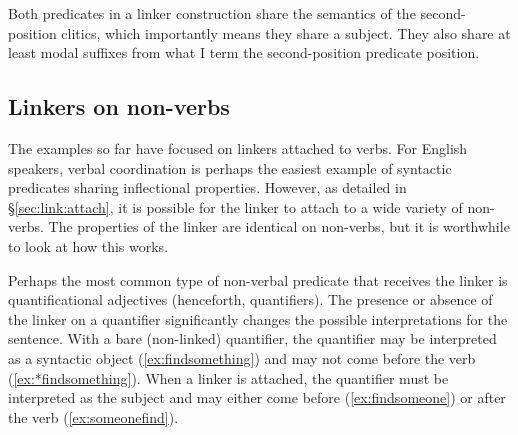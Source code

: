 Both predicates in a linker construction share the semantics of the second-position clitics, which importantly means they share a subject. They also share at least modal suffixes from what I term the second-position predicate position.


\begin{comment}
\ex \label{ex:someonespoke}
\begingl
\glpreamble ʔuušqḥʔaƛ ciqšiƛ.//
\gla ʔuuš-qḥ=ʔaƛ ciq-šiƛ //
\glb some-\textsc{link}=\textsc{now} speak-\textsc{mo} //
\glft `Someone spoke.' //
\endgl
\xe

\ex~ \label{ex:*someonespoke}
\begingl
\glpreamble *ʔuušqḥʔaƛ ciqšiƛḥ.//
\gla *ʔuuš-(q)ḥ=ʔaƛ ciq-šiƛ-(q)ḥ //
\glb *some-\textsc{link}=\textsc{now} speak-\textsc{mo}-\textsc{link} //
\glft Intended: `Someone spoke.' //
\endgl
\xe
\end{comment}


\subsection{Linkers on non-verbs} \label{sec:link:nonverb}

The examples so far have focused on linkers attached to verbs. For English speakers, verbal coordination is perhaps the easiest example of syntactic predicates sharing inflectional properties. However, as detailed in \S\ref{sec:link:attach}, it is possible for the linker to attach to a wide variety of non-verbs. The properties of the linker are identical on non-verbs, but it is worthwhile to look at how this works.

Perhaps the most common type of non-verbal predicate that receives the linker is quantificational adjectives (henceforth, quantifiers). The presence or absence of the linker on a quantifier significantly changes the possible interpretations for the sentence. With a bare (non-linked) quantifier, the quantifier may be interpreted as a syntactic object (\ref{ex:findsomething}) and may not come before the verb (\ref{ex:*findsomething}). When a linker is attached, the quantifier must be interpreted as the subject and may either come before (\ref{ex:findsomeone}) or after the verb (\ref{ex:someonefind}).

